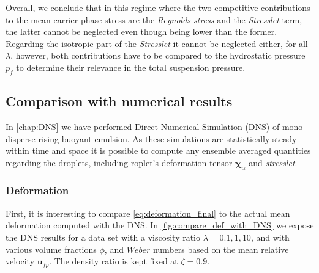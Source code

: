 Overall, we conclude that in this regime where the two competitive contributions to the mean carrier phase stress are the \textit{Reynolds stress} and the \textit{Stresslet} term, the latter cannot be neglected even though being lower than the former. 
Regarding the isotropic part of the \textit{Stresslet} it cannot be neglected either, for all $\lambda$, however, both contributions have to be compared to the hydrostatic pressure $p_f$ to determine their relevance in the total suspension pressure.

\subsection{Comparison with numerical results}

In \ref{chap:DNS} we have performed Direct Numerical Simulation (DNS) of mono-disperse rising buoyant emulsion. 
As these simulations are statistically steady within time and space it is possible to compute any ensemble averaged quantities regarding the droplets, including roplet's deformation tensor $\bm\chi_\alpha$ and \textit{stresslet}. 

\subsubsection{Deformation}

First, it is interesting to compare \ref{eq:deformation_final} to the actual mean deformation computed with the DNS. 
In \ref{fig:compare_def_with_DNS} we expose the DNS results for a data set with a viscosity ratio $\lambda = 0.1, 1, 10$, and with various volume fractions $\phi$,  and $Weber$ numbers based on the mean relative velocity $\textbf{u}_{fp}$. 
The density ratio is kept fixed at $\zeta = 0.9$. 

